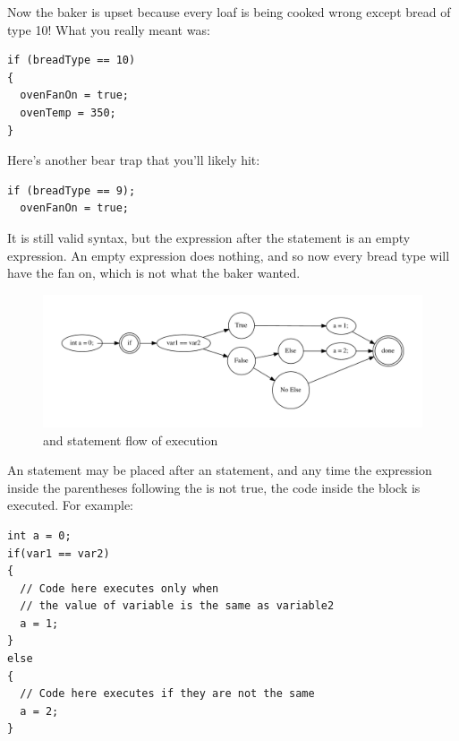 Now the baker is upset because every loaf is being cooked wrong except bread of type 10!
What you really meant was: 

\noindent\begin{minipage}{\linewidth}\begin{lstlisting}
if (breadType == 10)
{
  ovenFanOn = true;
  ovenTemp = 350;
}
\end{lstlisting}\end{minipage}

Here's another bear trap that you'll likely hit:

\noindent\begin{minipage}{\linewidth}\begin{lstlisting}
if (breadType == 9);
  ovenFanOn = true;
\end{lstlisting}\end{minipage}

It is still valid syntax, but the expression after the  statement is an empty expression.
An empty expression does nothing, and so now every bread type will have the fan on, which is not what the baker wanted.




\begin{figure}[tbh]
  \centering
  \includegraphics[width=\textwidth]{diagrams/if-flow.pdf}
  \caption{ and  statement flow of execution} \label{fig-if-flowchart}
\end{figure}


An  statement may be placed after an  statement, and any time the expression inside the parentheses following the  is not true, the code inside the  block is executed. 
For example: \nopagebreak[4]

\noindent\begin{minipage}{\linewidth}\begin{lstlisting}
int a = 0;
if(var1 == var2)
{
  // Code here executes only when
  // the value of variable is the same as variable2
  a = 1;
}
else
{
  // Code here executes if they are not the same
  a = 2;
}
\end{lstlisting}\end{minipage}

